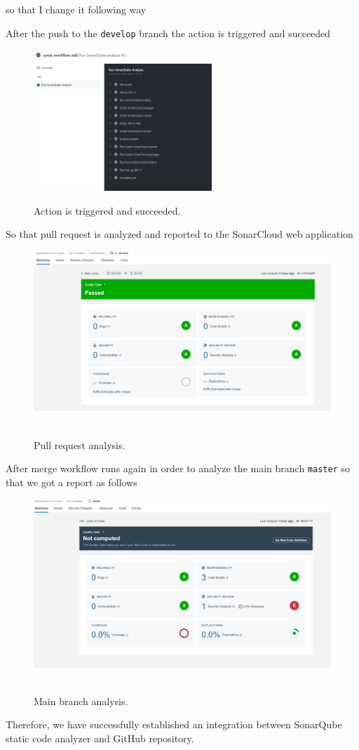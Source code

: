 so that I change it following way

After the push to the \texttt{develop} branch the action is triggered and succeeded
\begin{figure}[H]
    \centering
    \includegraphics[width=0.6\textwidth]{img/10_action_screenshot}
    ~\caption{Action is triggered and succeeded.}\label{fig:figure10}
\end{figure}
So that pull request is analyzed and reported to the SonarCloud web application
\begin{figure}[H]
    \centering
    \includegraphics[width=1\textwidth]{img/11_pull_request_analyzed}
    ~\caption{Pull request analysis.}\label{fig:figure11}
\end{figure}
After merge workflow runs again in order to analyze the main branch \texttt{master} so that
we got a report as follows
\begin{figure}[H]
    \centering
    \includegraphics[width=1\textwidth]{img/12_main_branch_analyze}
    ~\caption{Main branch analysis.}\label{fig:figure12}
\end{figure}
Therefore, we have successfully established an integration between SonarQube static code analyzer and GitHub repository.